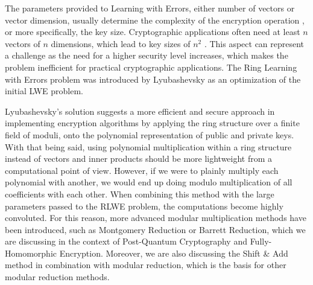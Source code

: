 \documentclass[11pt,
  titlepage=false,
  abstract=on,
]{scrreprt}
\begin{document}

The parameters provided to Learning with Errors, either number of vectors or vector dimension, usually determine the complexity of the encryption operation \cite{micciancio2013hardness}, or more specifically, the key size. 
Cryptographic applications often need at least  $n$ vectors of $n$ dimensions, which lead to key sizes of $n^2$ \cite{regev2010learning}. This aspect can represent a challenge as the need for a higher 
security level increases, which makes the problem inefficient for practical cryptographic applications.
The Ring Learning with Errors problem \cite{lyubashevsky2010ideal} was introduced by Lyubashevsky as an optimization of the initial LWE problem.

Lyubashevsky's solution suggests a more efficient and secure approach in implementing encryption algorithms by applying the ring structure over a finite field of moduli, onto the polynomial representation 
of public and private keys. With that being said, using polynomial multiplication within a ring structure instead of vectors and inner products should be more lightweight from a computational point of view.
However, if we were to plainly multiply each polynomial with another, we would end up doing modulo multiplication of all coefficients with each other. When combining this method with the large parameters passed to the RLWE
problem, the computations become highly convoluted. For this reason, more advanced modular multiplication methods have been introduced, such as Montgomery Reduction or Barrett Reduction, which we are discussing in the context of Post-Quantum Cryptography and 
Fully-Homomorphic Encryption. Moreover, we are also discussing the Shift \& Add method in combination with modular reduction, which is the basis for other modular reduction methods.

\end{document}

